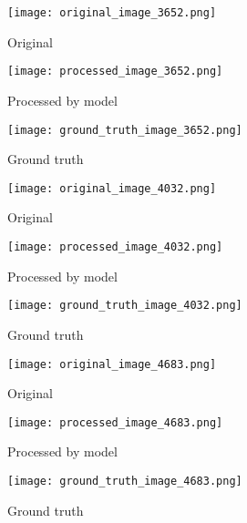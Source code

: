 \documentclass[12pt, a4paper]{article}
\begin{document}
\begin{figure}[ht]
  \centering
  \begin{minipage}[b]{0.3\textwidth}
    \texttt{[image: original\_image\_3652.png]}
    \caption{Original}
    \label{fig:original_3}
  \end{minipage}
  \hfill
  \begin{minipage}[b]{0.3\textwidth}
    \texttt{[image: processed\_image\_3652.png]}
    \caption{Processed by model}
    \label{fig:processed_3}
  \end{minipage}
  \hfill
  \begin{minipage}[b]{0.3\textwidth}
    \texttt{[image: ground\_truth\_image\_3652.png]}
    \caption{Ground truth}
    \label{fig:ground_truth_3}
  \end{minipage}
\end{figure}

\begin{figure}[ht]
  \centering
  \begin{minipage}[b]{0.3\textwidth}
    \texttt{[image: original\_image\_4032.png]}
    \caption{Original}
    \label{fig:original_4}
  \end{minipage}
  \hfill
  \begin{minipage}[b]{0.3\textwidth}
    \texttt{[image: processed\_image\_4032.png]}
    \caption{Processed by model}
    \label{fig:processed_4}
  \end{minipage}
  \hfill
  \begin{minipage}[b]{0.3\textwidth}
    \texttt{[image: ground\_truth\_image\_4032.png]}
    \caption{Ground truth}
    \label{fig:ground_truth_4}
  \end{minipage}
\end{figure}

\begin{figure}[ht]
  \centering
  \begin{minipage}[b]{0.3\textwidth}
    \texttt{[image: original\_image\_4683.png]}
    \caption{Original}
    \label{fig:original_5}
  \end{minipage}
  \hfill
  \begin{minipage}[b]{0.3\textwidth}
    \texttt{[image: processed\_image\_4683.png]}
    \caption{Processed by model}
    \label{fig:processed_5}
  \end{minipage}
  \hfill
  \begin{minipage}[b]{0.3\textwidth}
    \texttt{[image: ground\_truth\_image\_4683.png]}
    \caption{Ground truth}
    \label{fig:ground_truth_5}
  \end{minipage}
\end{figure}
\end{document}
